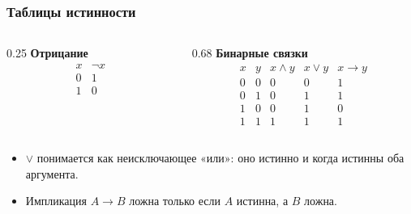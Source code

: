 \documentclass[10pt]{beamer}
\begin{document}
\begin{frame}
    \frametitle{Таблицы истинности}
    \begin{columns}[T,onlytextwidth]
        \begin{column}{0.25\textwidth}
            \centering
            \textbf{Отрицание}
            \[
            \begin{array}{c|c}
                x & \neg x \\
                \hline
                0 & 1 \\
                1 & 0
            \end{array}
            \]
        \end{column}
        \pause
        \begin{column}{0.68\textwidth}
            \centering
            \textbf{Бинарные связки}
            \[
            \begin{array}{cc|ccc}
                x & y & x \land y & x \lor y & x \to y \\
                \hline
                0 & 0 & 0 & 0 & 1 \\
                0 & 1 & 0 & 1 & 1 \\
                1 & 0 & 0 & 1 & 0 \\
                1 & 1 & 1 & 1 & 1
            \end{array}
            \]
        \end{column}
    \end{columns}
    \pause
    \begin{itemize}
        \item $\lor$ понимается как неисключающее «или»: оно истинно и когда истинны оба аргумента.
        \item Импликация $A \to B$ ложна только если $A$ истинна, а $B$ ложна.
    \end{itemize}
\end{frame}
\end{document}
